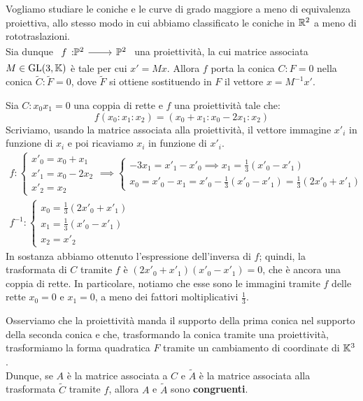 Vogliamo studiare le coniche e le curve di grado maggiore a meno di equivalenza proiettiva, allo stesso modo in cui abbiamo classificato le coniche in $\mathbb{R}^2$ a meno di rototraslazioni.\\
Sia dunque $\funz f {\proj[2]{\ }} {\proj[2]{\ }}$ una proiettività, la cui matrice associata $M\in\operatorname{GL}(3,\mathbb{K})$ è tale per cui $x'=Mx$. Allora $f$ porta la conica $C\colon F=0$ nella conica $\widetilde{C}\colon \widetilde{F}=0$, dove $\widetilde{F}$ si ottiene sostituendo in $F$ il vettore $x=M^{-1}x'$.
\begin{example}
Sia $C \colon x_0x_1=0$ una coppia di rette e $f$ una proiettività tale che:
\begin{equation*}
	f(x_0\colon x_1\colon x_2)=(x_0+x_1\colon x_0-2x_1\colon x_2)
\end{equation*}
Scriviamo, usando la matrice associata alla proiettività, il vettore immagine $x'_i$ in funzione di $x_i$ e poi ricaviamo $x_i$ in funzione di $x'_i$.
\begin{gather*}
f\colon \begin{cases}
x'_0=x_0+x_1\\
x'_1=x_0-2x_2\\
x'_2=x_2
\end{cases} \implies \begin{cases}
-3x_1=x'_1-x'_0 \implies x_1=\frac{1}{3}(x'_0-x'_1)\\
x_0=x'_0-x_1=x'_0 -\frac{1}{3}(x'_0-x'_1)=\frac{1}{3}(2x'_0+x'_1)
\end{cases}\\
f^{-1}\colon \begin{cases}
x_0=\frac{1}{3}(2x'_0+x'_1)\\
x_1=\frac{1}{3}(x'_0-x'_1)\\
x_2=x'_2
\end{cases}
\end{gather*}
In sostanza abbiamo ottenuto l'espressione dell'inversa di $f$; quindi, la trasformata di $C$ tramite $f$ è $(2x'_0+x'_1)(x'_0-x'_1)=0$, che è ancora una coppia di rette. In particolare, notiamo che esse sono le immagini tramite $f$ delle rette $x_0=0$ e $x_1=0$, a meno dei fattori moltiplicativi $\frac{1}{3}$.
\end{example}
Osserviamo che la proiettività manda il supporto della prima conica nel supporto della seconda conica e che, trasformando la conica tramite una proiettività, trasformiamo la forma quadratica $F$ tramite un cambiamento di coordinate di $\mathbb{K}^3$.\\
Dunque, se $A$ è la matrice associata a $C$ e $\widetilde{A}$ è la matrice associata alla trasformata $\widetilde{C}$ tramite $f$, allora $A$ e $\widetilde{A}$ sono \textbf{congruenti}.
